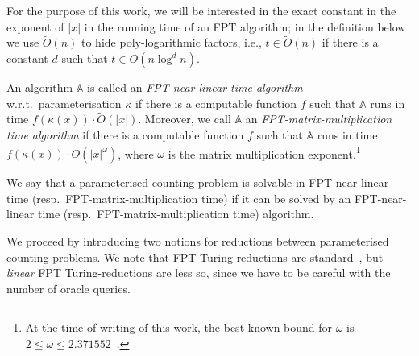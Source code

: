 \documentclass[authorcolumns,numberwithinsect]{no-lipics-v2022}
\begin{document}
For the purpose of this work, we will be interested in the exact constant in the exponent of $|x|$ in the running time of an FPT algorithm; in the definition below we use $\tilde{O}(n)$ to hide poly-logarithmic factors, i.e., $t\in \tilde{O}(n)$ if there is a constant $d$ such that $t\in O(n\log^dn)$.

\begin{definition}
    An algorithm $\mathbb{A}$ is called an \emph{FPT-near-linear time algorithm} w.r.t.\ parameterisation $\kappa$ if there is a computable function $f$ such that $\mathbb{A}$ runs in time $f(\kappa(x))\cdot \tilde{O}(|x|)$. Moreover, we call $\mathbb{A}$ an \emph{FPT-matrix-multiplication time algorithm} if there is a computable function $f$ such that $\mathbb{A}$ runs in time $f(\kappa(x))\cdot O(|x|^{\omega})$, where $\omega$ is the matrix multiplication exponent.\footnote{At the time of writing of this work, the best known bound for $\omega$ is $2\leq \omega\leq 2.371552$~\cite{WilliamsXXZ24}.}

    We say that a parameterised counting problem is solvable in FPT-near-linear time (resp.\ FPT-matrix-multiplication time) if it can be solved by an FPT-near-linear time (resp.\ FPT-matrix-multiplication time) algorithm.
\end{definition}


We proceed by introducing two notions for reductions between parameterised counting problems. We note that FPT Turing-reductions are standard~\cite[Chapter 14]{FlumG06}, but \emph{linear} FPT Turing-reductions are less so, since we have to be careful with the number of oracle queries.
\end{document}
